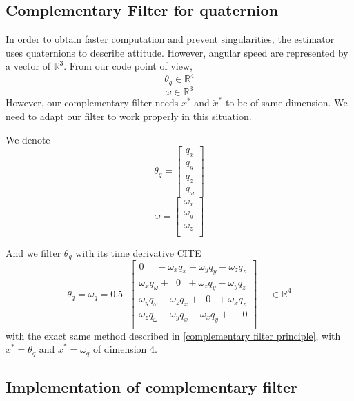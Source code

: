 \documentclass[a4paper,10pt]{article}
\begin{document}
\subsection{Complementary Filter for quaternion}
\label{complementary filter quaternion}
In order to obtain faster computation and prevent singularities, the estimator uses quaternions \cite{4} to describe attitude. However, angular speed are represented by a vector of $\mathbb{R}^3$. From our code point of view,
$$\theta_q \in\mathbb{R}^4$$
$$\omega \in\mathbb{R}^3$$
However, our complementary filter needs $x^*$ and $ \dot x^*$ to be of same dimension. We need to adapt our filter to work properly in this situation.

\medskip
We denote
$$\theta_q = \begin{bmatrix}  q_x\\ q_y\\ q_z\\  q_{\omega}      \end{bmatrix}$$
$$\omega = \begin{bmatrix}  \omega_x\\ \omega_y\\ \omega_z\\    \end{bmatrix}$$

And we filter $\theta_q$ with its time derivative CITE
$$ \dot \theta_q = \omega_q = 0.5 \cdot \begin{bmatrix}  
 0 \hspace{15pt}  -  \omega_x q_x    -   \omega_y q_y   -   \omega_z q_z\\
\omega_x q_\omega + \hspace{7pt} 0 \hspace{7pt} + \omega_z q_y - \omega_y q_z\\
\omega_y q_\omega - \omega_z q_x + \hspace{7pt} 0 \hspace{7pt} + \omega_x q_z \\   
\omega_z q_\omega - \omega_y q_x - \omega_x q_y + \hspace{15pt} 0 \\   

    \end{bmatrix} \hspace{15pt} \in\mathbb{R}^4$$
with the exact same method described in \ref{complementary filter principle}, with $x^* = \theta_q$ and $ \dot x^* = \omega_q$ of dimension $4$.

\subsection{Implementation of complementary filter}
\end{document}
